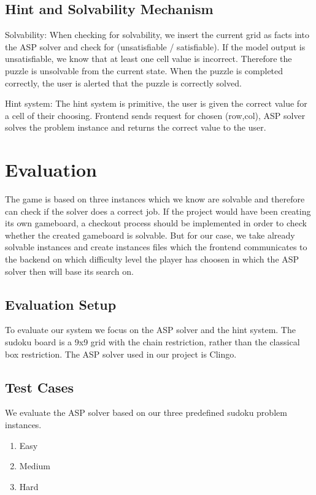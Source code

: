 \documentclass[11pt]{article}
\begin{document}
\subsection{Hint and Solvability Mechanism}
Solvability: When checking for solvability, we insert the current grid as facts into the ASP solver and check for (unsatisfiable / satisfiable).
            If the model output is unsatisfiable, we know that at least one cell value is incorrect. Therefore the puzzle is unsolvable from the current state.
            When the puzzle is completed correctly, the user is alerted that the puzzle is correctly solved. 

Hint system: The hint system is primitive, the user is given the correct value for a cell of their choosing.
Frontend sends request for chosen (row,col), ASP solver solves the problem instance and returns the correct value to the user. 

\newpage
\section{Evaluation}

The game is based on three instances which we know are solvable and therefore can check if the solver does a correct job. 
If the project would have been creating its own gameboard, a checkout process should be implemented in order to check whether the created gameboard is solvable.
But for our case, we take already solvable instances and create instances files which the frontend communicates to the backend 
on which difficulty level the player has choosen in which the ASP solver then will base its search on.

\subsection{Evaluation Setup}
To evaluate our system we focus on the ASP solver and the hint system.
The sudoku board is a 9x9 grid with the chain restriction, rather than the
classical box restriction.
The ASP solver used in our project is Clingo.

\subsection{Test Cases}
We evaluate the ASP solver based on our three predefined sudoku problem instances.
\begin{enumerate}
  \item Easy
  \item Medium
  \item Hard
\end{enumerate}
\end{document}
